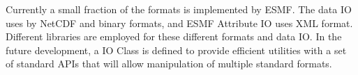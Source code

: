 
\begin{enumerate}

Currently a small fraction of the formats is implemented by ESMF.  
The data IO uses by NetCDF and binary formats, and ESMF Attribute
IO uses XML format.  Different libraries are employed for these 
different formats and data IO. In the future development, a IO Class
is defined to provide efficient utilities with a set of standard
APIs that will allow manipulation of multiple standard formats.

\end{enumerate}
